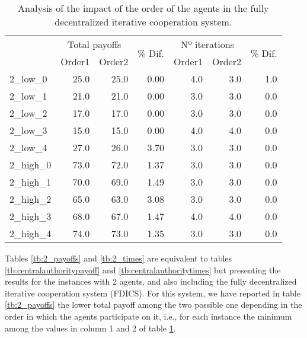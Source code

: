 \documentclass{article}
\begin{document}
\begin{table}[ht!]
\centering
\caption{Analysis of the impact of the order of the agents in the fully decentralized iterative cooperation system. \label{tb:iter_order_comparition}}
\begin{adjustbox}{max width=\textwidth}
\begin{tabular}{lrrrrrr}
\toprule
{} & \multicolumn{2}{c}{Total payoffs} & \multirow{2}{*}{\% Dif.} & \multicolumn{2}{c}{Nº iterations} & \multirow{2}{*}{\% Dif.} \\
{} &  Order1 &  Order2 &       &  Order1 &  Order2 & \\
\midrule
2\_low\_0  &           25.0 &           25.0 &  0.00 &        4.0 &        3.0 &     1.0 \\
2\_low\_1  &           21.0 &           21.0 &  0.00 &        3.0 &        3.0 &     0.0 \\
2\_low\_2  &           17.0 &           17.0 &  0.00 &        3.0 &        3.0 &     0.0 \\
2\_low\_3  &           15.0 &           15.0 &  0.00 &        4.0 &        4.0 &     0.0 \\
2\_low\_4  &           27.0 &           26.0 &  3.70 &        3.0 &        3.0 &     0.0 \\
2\_high\_0 &           73.0 &           72.0 &  1.37 &        3.0 &        3.0 &     0.0 \\
2\_high\_1 &           70.0 &           69.0 &  1.49 &        3.0 &        3.0 &     0.0 \\
2\_high\_2 &           65.0 &           63.0 &  3.08 &        3.0 &        3.0 &     0.0 \\
2\_high\_3 &           68.0 &           67.0 &  1.47 &        4.0 &        4.0 &     0.0 \\
2\_high\_4 &           74.0 &           73.0 &  1.35 &        3.0 &        3.0 &     0.0 \\
\bottomrule
\end{tabular}
\end{adjustbox}
\end{table}


Tables \ref{tb:2_payoffs} and \ref{tb:2_times} are equivalent to tables \ref{tb:centralauthoritypayoff} and \ref{tb:centralauthoritytimes} but presenting the results for the instances with 2 agents, and also including the fully decentralized iterative cooperation system (FDICS). For this system, we have reported in table \ref{tb:2_payoffs} the lower total payoff among the two possible one depending in the order in which the agents participate on it, i.e., for each instance the minimum among the values in column 1 and 2 of table \ref{tb:iter_order_comparition}.
\end{document}
